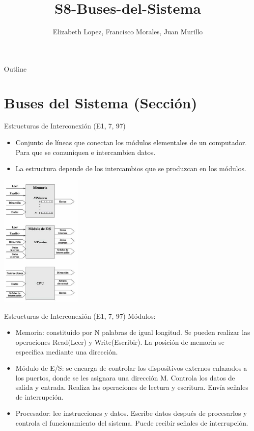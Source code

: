 \documentclass[presentation]{beamer}
\author{Elizabeth Lopez, Francisco Morales, Juan Murillo}
\date{}
\title{S8-Buses-del-Sistema}
\begin{document}
\maketitle
\begin{frame}{Outline}
\tableofcontents
\end{frame}



\section{Buses del Sistema (Sección)}
\label{sec:org69cbde6}
\begin{frame}[label={sec:org20a9942}]{Estructuras de Interconexión (E1, 7, 97)}
\begin{itemize}
\item Conjunto de líneas que conectan los módulos elementales de un computador.
Para que se comuniquen e intercambien datos.
\item La estructura depende de los intercambios que se produzcan en los módulos.
\end{itemize}

\begin{center}
\includegraphics[width=0.3\textwidth]{./Images/Modulos.jpg}
\end{center}
\end{frame}

\begin{frame}[label={sec:orge7ffe17}]{Estructuras de Interconexión (E1, 7, 97)}
\alert{Módulos:}

\begin{itemize}
\item \alert{\alert{Memoria:}} constituido por N palabras de igual longitud. Se pueden realizar las
operaciones Read(Leer) y Write(Escribir). La posición de memoria se especifica
mediante una dirección.
\item \alert{\alert{Módulo de E/S:}} se encarga de controlar los dispositivos externos enlazados
a los puertos, donde se les asignara una dirección M. Controla los datos de salida
y entrada. Realiza las operaciones de lectura y escritura. Envía señales de interrupción.
\item \alert{\alert{Procesador:}} lee instrucciones y datos. Escribe datos después de procesarlos y
controla el funcionamiento del sistema. Puede recibir señales de interrupción.
\end{itemize}
\end{frame}
\end{document}
